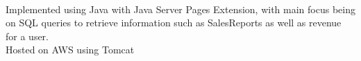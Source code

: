 \documentclass[]{Resume}
\begin{document}
\begin{minipage}[t]{0.66\textwidth}
\sectionsep

 \\
\textbullet{} Implemented using Java with Java Server Pages Extension, with main focus being on SQL queries to retrieve information such as SalesReports as well as revenue for a user. \\
\textbullet{} Hosted on AWS using Tomcat

\sectionsep

\end{minipage} 
\end{document}
